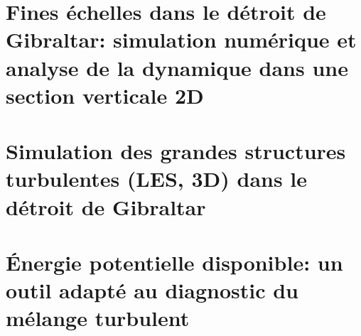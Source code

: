 \documentclass[a4paper,12pt,notitlepage,twoside]{report}
\numberwithin{equation}{section}
\begin{document}


\chapter[Fines échelles dans le détroit de Gibraltar: section verticale 2D]{Fines échelles dans le détroit de Gibraltar: simulation numérique et analyse de la dynamique dans une section verticale 2D}
\label{chapGBR2D}


%



\chapter{Simulation des grandes structures turbulentes (LES, 3D) dans le détroit de Gibraltar}
\label{chapGBR3D}
 





\chapter{Énergie potentielle disponible: un outil adapté au diagnostic du mélange turbulent}
\label{chapBPE}
\end{document}
